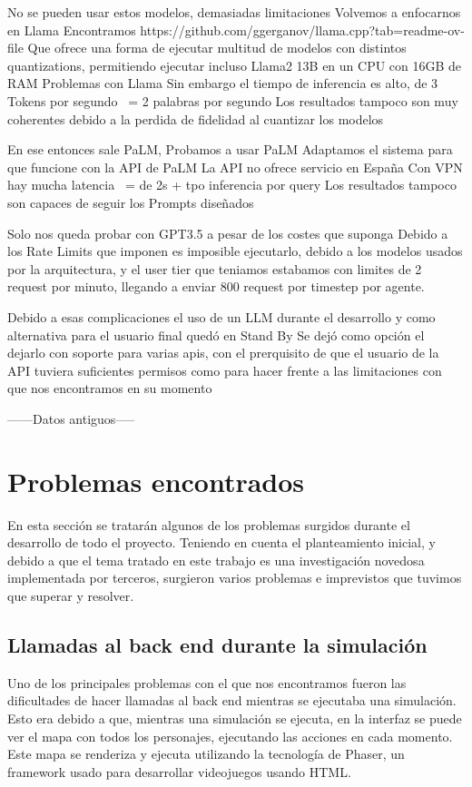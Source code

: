 	No se pueden usar estos modelos, demasiadas limitaciones
	Volvemos a enfocarnos en Llama
		Encontramos https://github.com/ggerganov/llama.cpp?tab=readme-ov-file
		Que ofrece una forma de ejecutar multitud de modelos con distintos quantizations, permitiendo ejecutar incluso Llama2 13B en un CPU con 16GB de RAM
	Problemas con Llama
		Sin embargo el tiempo de inferencia es alto, de 3 Tokens por segundo ~= 2 palabras por segundo
		Los resultados tampoco son muy coherentes debido a la perdida de fidelidad al cuantizar los modelos

	En ese entonces sale PaLM, Probamos a usar PaLM
		Adaptamos el sistema para que funcione con la API de PaLM
		La API no ofrece servicio en España
		Con VPN hay mucha latencia ~= de 2s + tpo inferencia por query
		Los resultados tampoco son capaces de seguir los Prompts diseñados

	Solo nos queda probar con GPT3.5 a pesar de los costes que suponga
		Debido a los Rate Limits que imponen es imposible ejecutarlo, debido a los modelos usados por la arquitectura, y el user tier que teniamos estabamos con limites de 2 request por minuto, llegando a enviar 800 request por timestep por agente.
	
	Debido a esas complicaciones el uso de un LLM durante el desarrollo y como alternativa para el usuario final quedó en Stand By
		Se dejó como opción el dejarlo con soporte para varias apis, con el prerquisito de que el usuario de la API tuviera suficientes permisos como para hacer frente a las limitaciones con que nos encontramos en su momento

------Datos antiguos-----


\section{Problemas encontrados}

En esta sección se tratarán algunos de los problemas surgidos durante el desarrollo de todo el proyecto. Teniendo en cuenta el planteamiento inicial, y debido a que el tema tratado en este trabajo es una investigación novedosa implementada por terceros, surgieron varios problemas e imprevistos que tuvimos que superar y resolver.

\subsection{Llamadas al back end durante la simulación}

Uno de los principales problemas con el que nos encontramos fueron las dificultades de hacer llamadas al back end mientras se ejecutaba una simulación. Esto era debido a que, mientras una simulación se ejecuta, en la interfaz se puede ver el mapa con todos los personajes, ejecutando las acciones en cada momento. Este mapa se renderiza y ejecuta utilizando la tecnología de Phaser, un framework usado para desarrollar videojuegos usando HTML.

